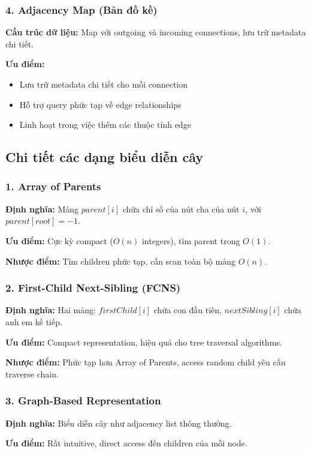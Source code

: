 \documentclass[12pt]{article}
\begin{document}
\subsubsection*{4. Adjacency Map (Bản đồ kề)}
\textbf{Cấu trúc dữ liệu:} Map với outgoing và incoming connections, lưu trữ metadata chi tiết.

\textbf{Ưu điểm:}
\begin{itemize}
  \item Lưu trữ metadata chi tiết cho mỗi connection
  \item Hỗ trợ query phức tạp về edge relationships
  \item Linh hoạt trong việc thêm các thuộc tính edge
\end{itemize}

\subsection*{Chi tiết các dạng biểu diễn cây}

\subsubsection*{1. Array of Parents}
\textbf{Định nghĩa:} Mảng $parent[i]$ chứa chỉ số của nút cha của nút $i$, với $parent[root] = -1$.

\textbf{Ưu điểm:} Cực kỳ compact ($O(n)$ integers), tìm parent trong $O(1)$.

\textbf{Nhược điểm:} Tìm children phức tạp, cần scan toàn bộ mảng $O(n)$.

\subsubsection*{2. First-Child Next-Sibling (FCNS)}
\textbf{Định nghĩa:} Hai mảng: $firstChild[i]$ chứa con đầu tiên, $nextSibling[i]$ chứa anh em kế tiếp.

\textbf{Ưu điểm:} Compact representation, hiệu quả cho tree traversal algorithms.

\textbf{Nhược điểm:} Phức tạp hơn Array of Parents, access random child yêu cầu traverse chain.

\subsubsection*{3. Graph-Based Representation}
\textbf{Định nghĩa:} Biểu diễn cây như adjacency list thông thường.

\textbf{Ưu điểm:} Rất intuitive, direct access đến children của mỗi node.
\end{document}
